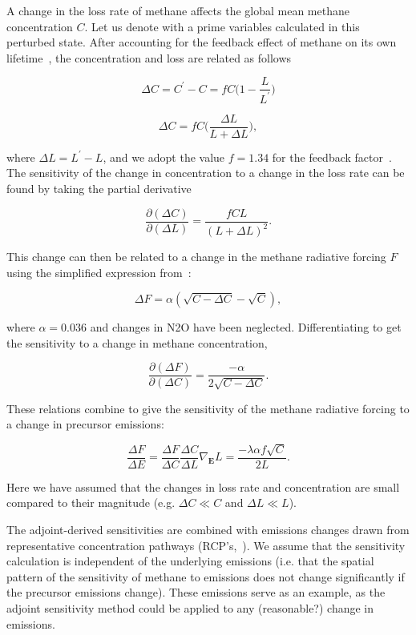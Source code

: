 A change in the loss rate of methane affects the global mean methane concentration $C$. Let us denote with a prime variables calculated in this perturbed state. After accounting for the feedback effect of methane on its own lifetime~\citep{ref:fuglestvedt1999,ref:naik2005}, the concentration and loss are related as follows

\begin{equation}
\Delta C = C^{\prime} - C = f C \Big(1 - \frac{L}{L^{\prime}}\Big)
\end{equation}

\begin{equation}
\Delta C = fC\Big(\frac{\Delta L}{L+\Delta L}\Big),
\end{equation}

where $\Delta L = L^{\prime}-L$, and we adopt the value $f=1.34$ for the feedback factor~\citep{ref:holmes2013}. The sensitivity of the change in concentration to a change in the loss rate can be found by taking the partial derivative

\begin{equation}
\frac{\partial (\Delta C)}{\partial (\Delta L)} = \frac{fCL}{(L+\Delta L)^2}.
\end{equation}

This change can then be related to a change in the methane radiative forcing $F$ using the simplified expression from~\citet{ref:myhre1998}:

\begin{equation}
\Delta F = \alpha (\sqrt{C-\Delta C} - \sqrt{C}),
\end{equation}

where $\alpha=0.036$ and changes in N2O have been neglected. Differentiating to get the sensitivity to a change in methane concentration,

\begin{equation}
\frac{\partial (\Delta F)}{\partial (\Delta C)} = \frac{-\alpha}{2\sqrt{C-\Delta C}}.
\end{equation}

These relations combine to give the sensitivity of the methane radiative forcing to a change in precursor emissions:

\begin{equation}
\frac{\Delta F}{\Delta E} = \frac{\Delta F}{\Delta C} \frac{\Delta C}{\Delta L} \nabla_{\mathbf{E}} L = \frac{-\lambda \alpha f \sqrt{C}}{2L}.
\end{equation}

Here we have assumed that the changes in loss rate and concentration are small compared to their magnitude (e.g. $\Delta C \ll C$ and $\Delta L \ll L$).

The adjoint-derived sensitivities are combined with emissions changes drawn from representative concentration pathways (RCP's,~\citet{ref:lamarque2011,ref:vanvuuren2011}). We assume that the sensitivity calculation is independent of the underlying emissions (i.e. that the spatial pattern of the sensitivity of methane to emissions does not change significantly if the precursor emissions change). These emissions serve as an example, as the adjoint sensitivity method could be applied to any (reasonable?) change in emissions.